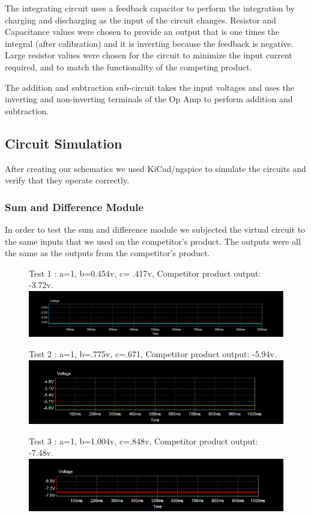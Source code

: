\documentclass[11pt]{article}
\begin{document}
	The integrating circuit uses a feedback capacitor to perform the integration by charging and discharging as the input of the circuit changes. Resistor and Capacitance values were chosen to provide an output that is one times the integral (after calibration) and it is inverting because the feedback is negative. Large resistor values were chosen for the circuit to minimize the input current required, and to match the functionality of the competing product.
	
	The addition and subtraction sub-circuit takes the input voltages and uses the inverting and non-inverting terminals of the Op Amp to perform addition and subtraction. 
	
	\subsection*{Circuit Simulation}
	After creating our schematics we used KiCad/ngspice to simulate the circuits and verify that they operate correctly.
	\subsubsection*{Sum and Difference Module}
	In order to test the sum and difference module we subjected the virtual circuit to the same inputs that we used on the competitor's product. The outputs were all the same as the outputs from the competitor's product.
	
	\begin{figure}[H]
		Test 1 : a=1, b=0.454v, c= .417v, Competitor product output: -3.72v.
		\centering
		\includegraphics[width=7in]{images/simulation_sum4.png}
	\end{figure}
	\vspace{20px}
	\begin{figure}[H]
		Test 2 : a=1, b=.775v, c=.671, Competitor product output: -5.94v.
		\centering
		\includegraphics[width=7in]{images/simulation_sum2.png}
	\end{figure}
	\vspace{20px}
	\begin{figure}[H]
		Test 3 : a=1, b=1.004v, c=.848v, Competitor product output: -7.48v. 
		\centering
		\includegraphics[width=7in]{images/simulation_sum1.png}
	\end{figure}
	
\end{document}
